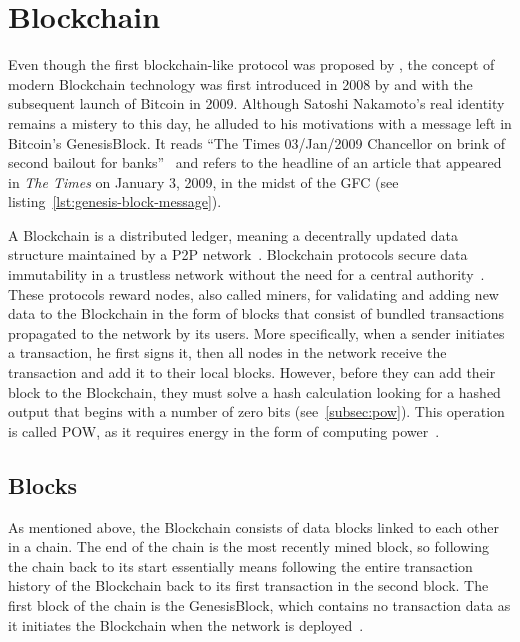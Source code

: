 \section{Blockchain}\label{sec:blockchain}

Even though the first blockchain-like protocol was proposed by \textcite{chaum_computer_1982}, the concept of modern \gls{Blockchain} technology was first introduced in 2008 by \textcite{nakamoto_bitcoin_2008} and with the subsequent launch of Bitcoin in 2009.
Although Satoshi Nakamoto's real identity remains a mistery to this day, he alluded to his motivations with a message left in Bitcoin's \gls{GenesisBlock}.
It reads \enquote{The Times 03/Jan/2009 Chancellor on brink of second bailout for banks}~\autocite{nakamoto_bitcoin_2009} and refers to the headline of an article that appeared in \emph{The Times} on January 3, 2009, in the midst of the \gls{GFC} (see listing~\ref{lst:genesis-block-message}).


A \gls{Blockchain} is a distributed ledger, meaning a decentrally updated data structure maintained by a \gls{P2P} network~\autocites[3]{crosby_blockchain_2015}[1]{nakamoto_bitcoin_2008}.
\Gls{Blockchain} protocols secure data immutability in a trustless network without the need for a central authority~\autocites[3]{crosby_blockchain_2015}[4]{jafar_blockchain_2021}.
These protocols reward nodes, also called miners, for validating and adding new data to the \gls{Blockchain} in the form of blocks that consist of bundled transactions propagated to the network by its users.
More specifically, when a sender initiates a transaction, he first signs it, then all nodes in the network receive the transaction and add it to their local blocks.
However, before they can add their block to the \gls{Blockchain}, they must solve a hash calculation looking for a hashed output that begins with a number of zero bits (see~\cref{subsec:pow}).
This operation is called \gls{POW}, as it requires energy in the form of computing power~\autocite[3]{nakamoto_bitcoin_2008}.

\subsection{Blocks}\label{subsec:blocks}

As mentioned above, the \gls{Blockchain} consists of data blocks linked to each other in a chain.
The end of the chain is the most recently mined block, so following the chain back to its start essentially means following the entire transaction history of the \gls{Blockchain} back to its first transaction in the second block.
The first block of the chain is the \gls{GenesisBlock}, which contains no transaction data as it initiates the \gls{Blockchain} when the network is deployed~\autocites[162]{antonopoulos_mastering_2017}[31]{antonopoulos_mastering_2019}.


